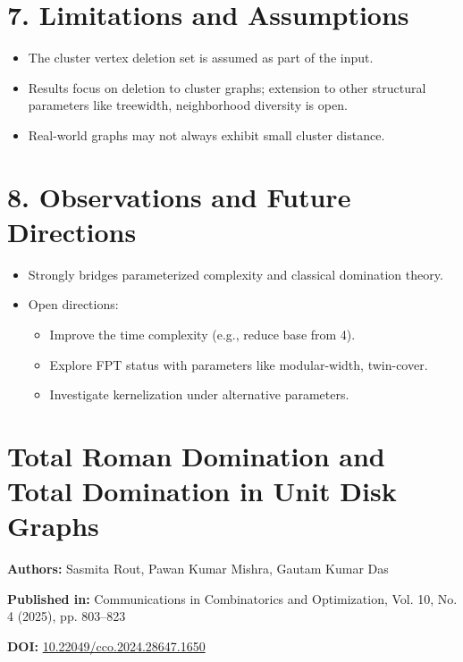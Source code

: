 \documentclass{article}
\begin{document}
\section*{7. Limitations and Assumptions}
\begin{itemize}[leftmargin=1.5em]
    \item The cluster vertex deletion set is assumed as part of the input.
    \item Results focus on deletion to cluster graphs; extension to other structural parameters like treewidth, neighborhood diversity is open.
    \item Real-world graphs may not always exhibit small cluster distance.
\end{itemize}

\section*{8. Observations and Future Directions}
\begin{itemize}[leftmargin=1.5em]
    \item Strongly bridges parameterized complexity and classical domination theory.
    \item Open directions:
    \begin{itemize}
        \item Improve the time complexity (e.g., reduce base from 4).
        \item Explore FPT status with parameters like modular-width, twin-cover.
        \item Investigate kernelization under alternative parameters.
    \end{itemize}
\end{itemize}

\section*{Total Roman Domination and Total Domination in Unit Disk Graphs}

\textbf{Authors:} Sasmita Rout, Pawan Kumar Mishra, Gautam Kumar Das

\textbf{Published in:} Communications in Combinatorics and Optimization, Vol. 10, No. 4 (2025), pp. 803–823

\textbf{DOI:} \href{https://doi.org/10.22049/cco.2024.28647.1650}{10.22049/cco.2024.28647.1650}

\vspace{1em}
\end{document}
